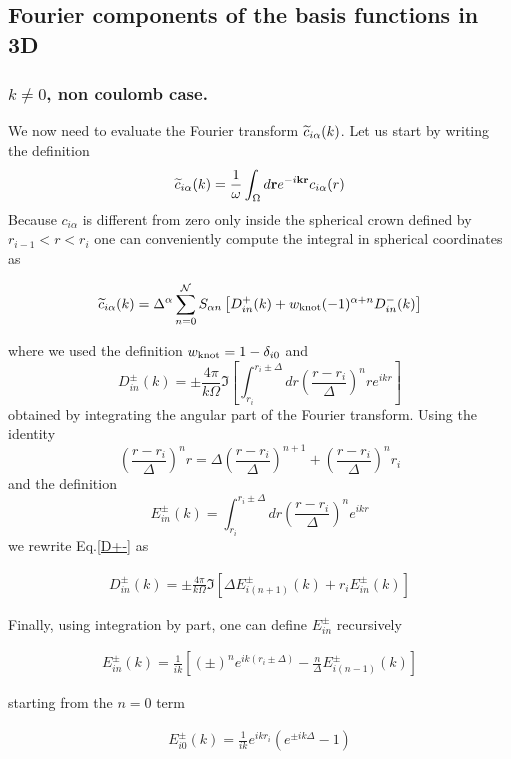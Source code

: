 \subsection{Fourier components of the basis functions in 3D}
\subsubsection*{$k\ne 0$, non coulomb case.}
We now need to evaluate the Fourier transform $\tc_{i\alpha}(k)$. Let us start
by writing the definition
\begin{equation}
\tc_{i\alpha}(k)=\frac{1}{\omega}\int_\Omega d\rv  e^{-i\kv\rv} c_{i\alpha}(r)
\end{equation}
Because $c_{i\alpha}$ is different from zero only inside the spherical crown
defined by $r_{i-1}<r<r_i$ one can conveniently compute the integral in spherical
coordinates as
\vskip 3mm
\begin{center}
\begin{eqnarray}
\tc_{i\alpha}(k)=\Delta^\alpha\sum_{n=0}^\mathcal{N} S_{\alpha n} \left[
D_{in}^+(k) +\wk(-1)^{\alpha+n}D_{in}^-(k)\right]
\label{fourier_transform}
\end{eqnarray}
\end{center}
\vskip 3mm
where we used the definition $\wk=1-\delta_{i0}$ and
\begin{equation}
D_{in}^\pm(k)=\pm\frac{4\pi}{k\Omega}\Im\left[\int_{r_i}^{r_i\pm\Delta}
dr\left(\frac{r-r_i}{\Delta}\right)^n r e^{ikr}\right]
\label{D+-}
\end{equation}
obtained by integrating the angular part of the Fourier transform.
Using the identity
\begin{equation}
\left(\frac{r-r_i}{\Delta}\right)^n r=\Delta\left(\frac{r-r_i}{\Delta}\right)^{n+1}+\left(\frac{r-r_i}{\Delta}\right)^n r_i
\end{equation}
and the definition
\begin{equation}
E_{in}^\pm(k)=\int_{r_i}^{r_i\pm\Delta}
dr\left(\frac{r-r_i}{\Delta}\right)^n e^{ikr}
\end{equation}
we rewrite Eq.\ref{D+-} as
\begin{center}
\vskip 3mm
\begin{eqnarray}
D_{in}^\pm(k)=\pm\frac{4\pi}{k\Omega}\Im\left[\Delta E_{i(n+1)}^\pm(k)+
r_i E_{in}^\pm(k)\right]
\label{noncoulD+-}
\end{eqnarray}
\end{center}
\vskip 3mm

Finally, using integration by part, one can define $E^\pm_{in}$ recursively
\begin{center}
\vskip 3mm
\begin{eqnarray}
E^\pm_{in}(k)=\frac{1}{ik}\left[(\pm)^ne^{ik(r_i\pm\Delta)}-\frac{n}{\Delta}
E^\pm_{i(n-1)}(k)\right]
\label{nthEpm}
\end{eqnarray}
\end{center}
\vskip 3mm
\noindent
starting from the $n=0$ term
\vskip 3mm
\begin{center}
\begin{eqnarray}
E^\pm_{i0}(k)=\frac{1}{ik}e^{ikr_i}\left(e^{\pm ik\Delta}-1\right)
\label{0thEpm}
\end{eqnarray}
\end{center}
\vskip 3mm
